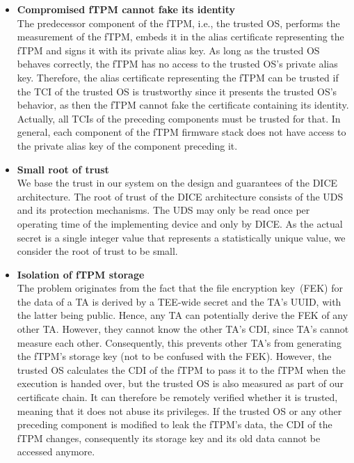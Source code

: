\begin{itemize}
    \item{\textbf{Compromised fTPM cannot fake its identity}\\
    The predecessor component of the fTPM, i.e., the trusted OS, performs the measurement of the fTPM, embeds it in the alias certificate representing the fTPM and signs it with its private alias key.
    As long as the trusted OS behaves correctly, the fTPM has no access to the trusted OS's private alias key.
    Therefore, the alias certificate representing the fTPM can be trusted if the TCI of the trusted OS is trustworthy since it presents the trusted OS's behavior, as then the fTPM cannot fake the certificate containing its identity.
    Actually, all TCIs of the preceding components must be trusted for that.
    In general, each component of the fTPM firmware stack does not have access to the private alias key of the component preceding it.}

    \item{\textbf{Small root of trust}\\
    We base the trust in our system on the design and guarantees of the DICE architecture.
    The root of trust of the DICE architecture consists of the UDS and its protection mechanisms.
    The UDS may only be read once per operating time of the implementing device and only by DICE\@.
    As the actual secret is a single integer value that represents a statistically unique value, we consider the root of trust to be small.}

    \item{\textbf{Isolation of fTPM storage}\\
    The problem originates from the fact that the file encryption key~(FEK) for the data of a TA is derived by a TEE-wide secret and the TA's UUID, with the latter being public.
    Hence, any TA can potentially derive the FEK of any other TA\@.
    However, they cannot know the other TA's CDI, since TA's cannot measure each other.
    Consequently, this prevents other TA's from generating the fTPM's storage key (not to be confused with the FEK).
    However, the trusted OS calculates the CDI of the fTPM to pass it to the fTPM when the execution is handed over, but the trusted OS is also measured as part of our certificate chain.
    It can therefore be remotely verified whether it is trusted, meaning that it does not abuse its privileges.
    If the trusted OS or any other preceding component is modified to leak the fTPM's data, the CDI of the fTPM changes, consequently its storage key and its old data cannot be accessed anymore.}


\end{itemize}
